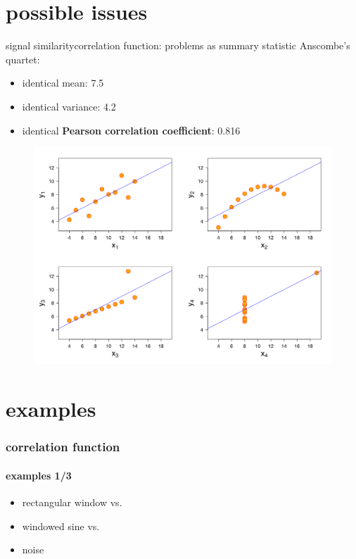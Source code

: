 \section{possible issues}
\begin{frame}{signal similarity}{correlation function: problems as summary statistic}
Anscombe's quartet:
    \begin{itemize}
        \item   identical mean: 7.5
        \item   identical variance: 4.2
        \item   identical \textbf{Pearson correlation coefficient}: 0.816
    \end{itemize}
    \begin{figure}
        \includegraphics[scale=.2]{graph/Anscombes_quartet}
    \end{figure}
\end{frame}

\section{examples}
\begin{frame}\frametitle{correlation function}\framesubtitle{examples 1/3}
			
		\begin{itemize}
			\item	rectangular window vs.
			\item	windowed sine vs.
			\item	noise
		\end{itemize}
\end{frame}

